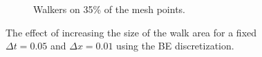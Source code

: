 \begin{figure}[H]
\begin{subfigure}[b]{0.48\textwidth}
 \caption{Walkers on 35\% of the mesh points.}
 \label{errorplot_BE1D_walk_35_percent}
\end{subfigure}
\caption[Effects of increasing relative size of walk area]{The effect of increasing the size of the walk area for a fixed $\Delta t = 0.05$ and $\Delta x = 0.01$ using the BE discretization.}
\label{testing_walk_area_size_BE}
\end{figure}